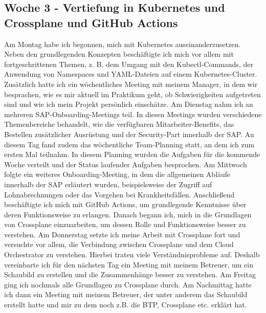 \subsection{Woche 3 - Vertiefung in Kubernetes und Crossplane und GitHub Actions}
Am Montag habe ich begonnen, mich mit Kubernetes auseinanderzusetzen. Neben
den grundlegenden Konzepten beschäftigte ich mich vor allem mit fortgeschrittenen
Themen, z. B. dem Umgang mit den Kubectl-Commands, der Anwendung von
Namespaces und YAML-Dateien auf einem Kubernetes-Cluster. Zusätzlich hatte ich
ein wöchentliches Meeting mit meinem Manager, in dem wir besprachen, wie es mir
aktuell im Praktikum geht, ob Schwierigkeiten aufgetreten sind und wie ich mein
Projekt persönlich einschätze.
Am Dienstag nahm ich an mehreren SAP-Onboarding-Meetings teil. In diesen
Meetings wurden verschiedene Themenbereiche behandelt, wie die verfügbaren
Mitarbeiter-Benefits, das Bestellen zusätzlicher Ausrüstung und der Security-Part
innerhalb der SAP. An diesem Tag fand zudem das wöchentliche Team-Planning statt,
an dem ich zum ersten Mal teilnahm. In diesem Planning wurden die Aufgaben für
die kommende Woche verteilt und der Status laufender Aufgaben besprochen.
Am Mittwoch folgte ein weiteres Onboarding-Meeting, in dem die allgemeinen
Abläufe innerhalb der SAP erläutert wurden, beispielsweise der Zugriff auf
Lohnabrechnungen oder das Vorgehen bei Krankheitsfällen. Anschließend
beschäftigte ich mich mit GitHub Actions, um grundlegende Kenntnisse über deren
Funktionsweise zu erlangen. Danach begann ich, mich in die Grundlagen von
Crossplane einzuarbeiten, um dessen Rolle und Funktionsweise besser zu
verstehen. Am Donnerstag setzte ich meine Arbeit mit Crossplane fort und versuchte
vor allem, die Verbindung zwischen Crossplane und dem Cloud Orchestrator zu
verstehen. Hierbei traten viele Verständnisprobleme auf. Deshalb vereinbarte ich für
den nächsten Tag ein Meeting mit meinem Betreuer, um ein Schaubild zu erstellen
und die Zusammenhänge besser zu verstehen.
Am Freitag ging ich nochmals alle Grundlagen zu Crossplane durch. Am Nachmittag
hatte ich dann ein Meeting mit meinem Betreuer, der unter anderem das Schaubild
erstellt hatte und mir zu dem noch z.B. die BTP, Crossplane etc. erklärt hat.

